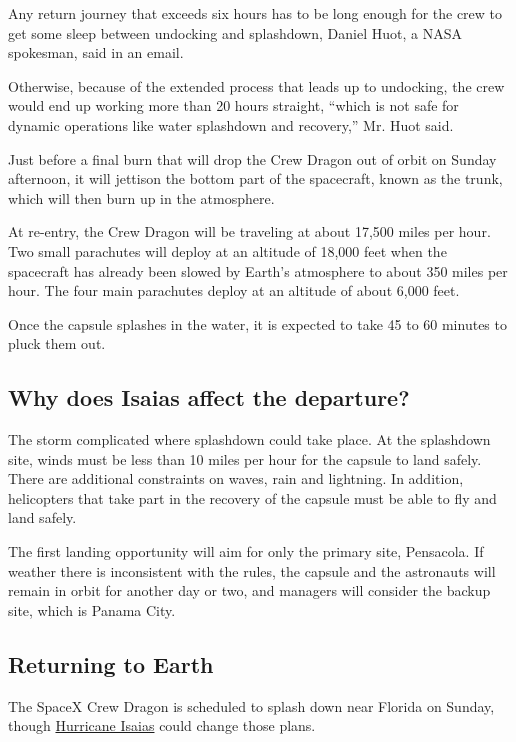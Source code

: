 Any return journey that exceeds six hours has to be long enough for the
crew to get some sleep between undocking and splashdown, Daniel Huot, a
NASA spokesman, said in an email.

Otherwise, because of the extended process that leads up to undocking,
the crew would end up working more than 20 hours straight, ``which is
not safe for dynamic operations like water splashdown and recovery,''
Mr. Huot said.

Just before a final burn that will drop the Crew Dragon out of orbit on
Sunday afternoon, it will jettison the bottom part of the spacecraft,
known as the trunk, which will then burn up in the atmosphere.

At re-entry, the Crew Dragon will be traveling at about 17,500 miles per
hour. Two small parachutes will deploy at an altitude of 18,000 feet
when the spacecraft has already been slowed by Earth's atmosphere to
about 350 miles per hour. The four main parachutes deploy at an altitude
of about 6,000 feet.

Once the capsule splashes in the water, it is expected to take 45 to 60
minutes to pluck them out.

\hypertarget{why-does-isaias-affect-the-departure}{%
\subsection{Why does Isaias affect the
departure?}\label{why-does-isaias-affect-the-departure}}

The storm complicated where splashdown could take place. At the
splashdown site, winds must be less than 10 miles per hour for the
capsule to land safely. There are additional constraints on waves, rain
and lightning. In addition, helicopters that take part in the recovery
of the capsule must be able to fly and land safely.

The first landing opportunity will aim for only the primary site,
Pensacola. If weather there is inconsistent with the rules, the capsule
and the astronauts will remain in orbit for another day or two, and
managers will consider the backup site, which is Panama City.

\hypertarget{returning-to-earth}{%
\subsection{Returning to Earth}\label{returning-to-earth}}

The SpaceX Crew Dragon is scheduled to splash down near Florida on
Sunday, though
\href{https://www.nytimes3xbfgragh.onion/interactive/2020/07/31/us/hurricane-isaias-tracker-map.html}{Hurricane
Isaias} could change those plans.


